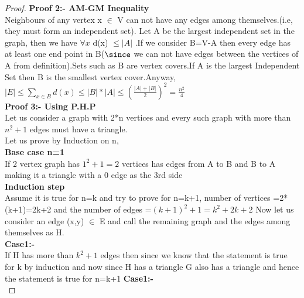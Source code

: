 \begin{proof}
\newpage
\textbf{Proof 2:- AM-GM Inequality}\\
Neighbours of any vertex x $\in$ V can not have any edges among themselves.(i.e, they must form an independent set). Let A be the largest independent set in the graph, then we have $\forall x$
d(x) $\leq |A|$ .If we consider B=V-A then every edge has at least one end point in B($\since$ we can not have edges between the vertices of A from definition).Sets such as B are vertex covers.If A is the largest Independent Set then B is the smallest vertex cover.Anyway, $|E| \leq \sum_{x \in B} d(x) \leq |B|*|A|\leq (\frac{|A|+|B|}{2})^2=\frac{n^2}{4}$\\
\textbf{Proof 3:- Using P.H.P}\\
Let us consider a graph with 2*n vertices and every such graph with more than $n^2+1$ edges must have a triangle.\\
Let us prove by Induction on n,\\
\textbf{Base case n=1}\\
If 2 vertex graph has $1^2+1=2$ vertices has edges from A to B and B to A making it a triangle with a 0 edge as the 3rd side\\
\textbf{Induction step}\\
Assume it is true for n=k and try to prove for n=k+1,
number of vertices =2*(k+1)=2k+2 and the number of edges =$(k+1)^2+1=k^2+2k+2$
Now let us consider an edge (x,y) $\in$ E and call the remaining graph and the edges among themselves as H.\\
\textbf{Case1:-}\\
If H has more than $k^2+1$ edges then since we know that the statement is true for k by induction and now since H has a triangle G also has a triangle and hence the statement is true for n=k+1
\textbf{Case1:-}\\

\end{proof}
